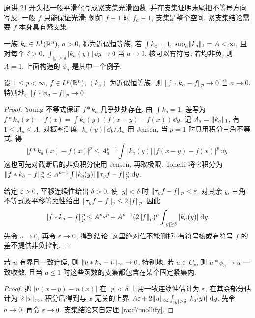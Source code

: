 \begin{remark}
原讲 21 开头把一般平滑化写成紧支集光滑函数, 并在支集证明末尾把不等号方向写反. 一般 $f$ 只能保证光滑; 例如 $f\equiv1$ 时 $f_a\equiv1$, 支集是整个空间. 紧支集结论需要 $f$ 本身具有紧支集.
\end{remark}


\begin{definition}[近似恒等族]
一族 $k_a\in L^1(\mathbb R^n)$, $a>0$, 称为近似恒等族, 若 $\int k_a=1$, $\sup_a\lVert k_a\rVert_1=A<\infty$, 且对每个 $\delta>0$,
$\int_{|y|\ge\delta}|k_a(y)|\,\dd y\to0$ 当 $a\to0$.
核可以有符号; 若均非负, 则 $A=1$. 上面构造的 $\phi_a$ 是其中一个例子.
\end{definition}

\begin{theorem}[$L^p$ 逼近]\label{ra:c7:approx}
设 $1\le p<\infty$, $f\in L^p(\mathbb R^n)$, $(k_a)$ 为近似恒等族. 则 $\lVert f*k_a-f\rVert_p\to0$ 当 $a\to0$. 特别地, $\lVert f*\phi_a-f\rVert_p\to0$.
\end{theorem}
\begin{proof}
Young 不等式保证 $f*k_a$ 几乎处处存在. 由 $\int k_a=1$, 差写为
$f*k_a(x)-f(x)=\int k_a(y)(f(x-y)-f(x))\,\dd y$.
记 $A_a=\lVert k_a\rVert_1$, 有 $1\le A_a\le A$. 对概率测度 $|k_a(y)|\,\dd y/A_a$ 用 Jensen, 当 $p=1$ 时只用积分三角不等式, 得
\[
 |f*k_a(x)-f(x)|^p
 \le A_a^{p-1}\int|k_a(y)|\,|f(x-y)-f(x)|^p\,\dd y.
\]
这也可先对截断后的非负积分使用 Jensen, 再取极限. Tonelli 将它积分为
$\lVert f*k_a-f\rVert_p^p
\le A^{p-1}\int|k_a(y)|\,\lVert \tau_yf-f\rVert_p^p\,\,\mathrm d y$.

给定 $\varepsilon>0$, 平移连续性给出 $\delta>0$, 使 $|y|<\delta$ 时 $\lVert \tau_yf-f\rVert_p<\varepsilon$. 对其余 $y$, 三角不等式及平移等距性给出 $\lVert \tau_yf-f\rVert_p\le2\lVert f\rVert_p$. 因此
\[
 \lVert f*k_a-f\rVert_p^p
 \le A^p\varepsilon^p+
 A^{p-1}(2\lVert f\rVert_p)^p\int_{|y|\ge\delta}|k_a(y)|\,\,\mathrm d y.
\]
先令 $a\to0$, 再令 $\varepsilon\to0$, 得到结论. 这里绝对值不能删掉: 有符号核或有符号 $f$ 的差不提供非负控制.
\end{proof}

\begin{proposition}[一致逼近]\label{ra:c7:uniform}
若 $u$ 有界且一致连续, 则 $\lVert u*k_a-u\rVert_\infty\to0$. 特别地, 若 $u\in C_c$, 则 $u*\phi_a\to u$ 一致收敛, 且当 $a\le1$ 时这些函数的支集都包含在某个固定紧集内.
\end{proposition}
\begin{proof}
把 $|u(x-y)-u(x)|$ 在 $|y|<\delta$ 上用一致连续性估计为 $\varepsilon$, 在其余部分估计为 $2\lVert u\rVert_\infty$. 积分后得到与 $x$ 无关的上界
$A\varepsilon+2\lVert u\rVert_\infty\int_{|y|\ge\delta}|k_a(y)|\,\,\mathrm d y$.
先令 $a\to0$, 再令 $\varepsilon\to0$. 支集结论来自定理 \ref{ra:c7:mollify}.
\end{proof}

